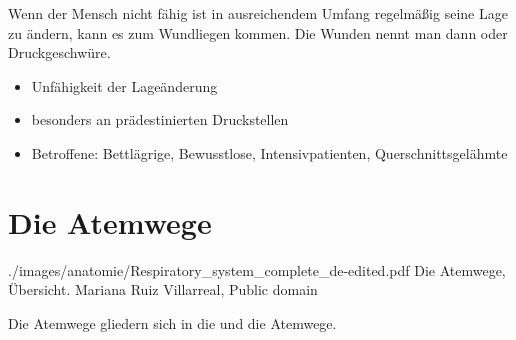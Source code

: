 {%
\label{topic:dekubitus}Wenn
der Mensch nicht fähig ist in ausreichendem Umfang
regelmäßig seine Lage zu ändern, kann es zum Wundliegen
kommen. Die Wunden nennt man dann  oder
Druckgeschwüre.
}
{
\begin{itemize}
  \item Unfähigkeit der Lageänderung
  \item besonders an prädestinierten Druckstellen
  \item Betroffene: Bettlägrige, Bewusstlose, Intensivpatienten,
  Querschnittsgelähmte
\end{itemize}
}{}{}{}

\clearpage
\section{Die Atemwege}
 \label{topic:atemwege-lunge}



{}
{}
{./images/anatomie/Respiratory_system_complete_de-edited.pdf}
{Die Atemwege, Übersicht.\label{fig:respiraktionstrakt-uebersicht}}
{Mariana Ruiz Villarreal, Public domain}


Die Atemwege gliedern sich in die  und die
 Atemwege.

